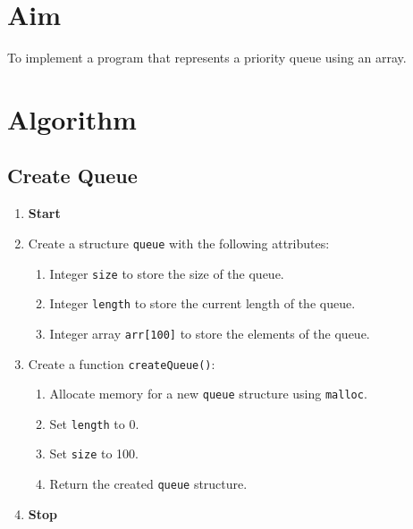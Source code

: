 
\section{Aim}
To implement a program that represents a priority queue using an array.

\section{Algorithm}
 {\selectfont

  \subsection{Create Queue}
  \begin{enumerate}[label=\arabic*:,left=0pt]
    \item \textbf{Start}
    \item Create a structure \texttt{queue} with the following attributes:
          \begin{enumerate}[label=2.\arabic*:,left=0pt]
            \item Integer \texttt{size} to store the size of the queue.
            \item Integer \texttt{length} to store the current length of the queue.
            \item Integer array \texttt{arr[100]} to store the elements of the queue.
          \end{enumerate}
    \item Create a function \texttt{createQueue()}:
          \begin{enumerate}[label=3.\arabic*:,left=0pt]
            \item Allocate memory for a new \texttt{queue} structure using \texttt{malloc}.
            \item Set \texttt{length} to 0.
            \item Set \texttt{size} to 100.
            \item Return the created \texttt{queue} structure.
          \end{enumerate}
    \item \textbf{Stop}
  \end{enumerate}

}
